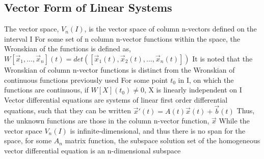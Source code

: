 \documentclass[11 pt, twoside]{article}
\newenvironment{outline*}
{
	\begin{outline}[enumerate]
	}
	{\end{outline}
}
\begin{document}
\subsection{Vector Form of Linear Systems}
\begin{outline*}
\1 The vector space, $V_n(I)$, is the vector space of column n-vectors defined on the interval I
\1 For some set of n column n-vector functions within the space, the Wronskian of the functions is defined as, $W[\vec{x}_1, \dots, \vec{x}_n](t) = det([\vec{x}_1(t), \vec{x}_2(t), \dots, \vec{x}_n(t)])$
\2 It is noted that the Wronskian of column n-vector functions is distinct from the Wronskian of continuous functions previously used
\2 For some point $t_0$ in I, on which the functions are continuous, if $W[X](t_0) \neq 0$, X is linearly independent on I
\1 Vector differential equations are systems of linear first order differential equations, such that they can be written $\vec{x}'(t) = A(t)\vec{x}(t) + \vec{b}(t)$
\2 Thus, the unknown functions are those in the column n-vector function, $\vec{x}$
\2 While the vector space $V_n(I)$ is infinite-dimensional, and thus there is no span for the space, for some $A_n$ matrix function, the subspace solution set of the homogeneous vector differential equation is an n-dimensional subspace
\end{outline*}
\end{document}
